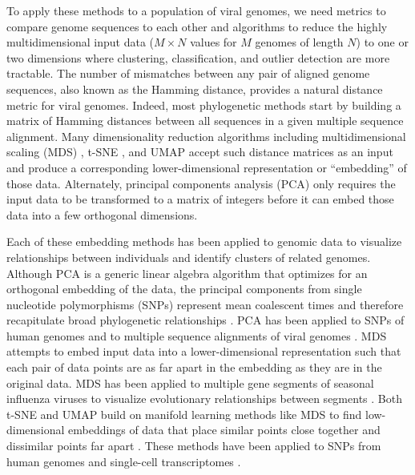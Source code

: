 \documentclass[10pt,letterpaper]{article}
\begin{document}
To apply these methods to a population of viral genomes, we need metrics to compare genome sequences to each other and algorithms to reduce the highly multidimensional input data ($M \times N$ values for $M$ genomes of length $N$) to one or two dimensions where clustering, classification, and outlier detection are more tractable.
The number of mismatches between any pair of aligned genome sequences, also known as the Hamming distance, provides a natural distance metric for viral genomes.
Indeed, most phylogenetic methods start by building a matrix of Hamming distances between all sequences in a given multiple sequence alignment.
Many dimensionality reduction algorithms including multidimensional scaling (MDS) \cite{hout_papesh_goldinger_2012}, t-SNE \cite{maaten2008visualizing}, and UMAP \cite{lel2018umap} accept such distance matrices as an input and produce a corresponding lower-dimensional representation or “embedding” of those data.
Alternately, principal components analysis (PCA) only requires the input data to be transformed to a matrix of integers before it can embed those data into a few orthogonal dimensions.

Each of these embedding methods has been applied to genomic data to visualize relationships between individuals and identify clusters of related genomes.
Although PCA is a generic linear algebra algorithm that optimizes for an orthogonal embedding of the data, the principal components from single nucleotide polymorphisms (SNPs) represent mean coalescent times and therefore recapitulate broad phylogenetic relationships \cite{mcvean_2009}.
PCA has been applied to SNPs of human genomes \cite{novembre_2008,alexander_2009,mcvean_2009,auton_2015} and to multiple sequence alignments of viral genomes \cite{metsky_2017}.
MDS attempts to embed input data into a lower-dimensional representation such that each pair of data points are as far apart in the embedding as they are in the original data.
MDS has been applied to multiple gene segments of seasonal influenza viruses to visualize evolutionary relationships between segments \cite{rambaut_2008}.
Both t-SNE and UMAP build on manifold learning methods like MDS to find low-dimensional embeddings of data that place similar points close together and dissimilar points far apart \cite{kobak_2021}.
These methods have been applied to SNPs from human genomes \cite{diaz-papkovich_2019} and single-cell transcriptomes \cite{becht_2018,kobak_2019}.
\end{document}

